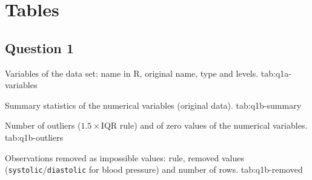 \section{Tables}\label{app:tables}

\subsection{Question 1}

  {Variables of the data set: name in R, original name, type and levels.}
  {tab:q1a-variables}

  {Summary statistics of the numerical variables (original data).}
  {tab:q1b-summary}

  {Number of outliers ($1.5 \times \mathrm{IQR}$ rule) and of zero values of the numerical variables.}
  {tab:q1b-outliers}

  {Observations removed as impossible values: rule, removed values (\texttt{systolic}/\texttt{diastolic} for blood pressure) and number of rows.}
  {tab:q1b-removed}

